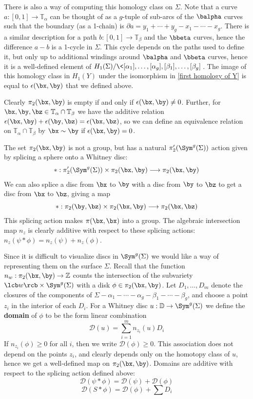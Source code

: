 There is also a way of computing this homology class on $\Sigma$. Note that a curve $a : [0,1] \rightarrow \mathbb T_\alpha$ can be thought of as a $g$-tuple of sub-arcs of the $\balpha$ curves such that the boundary (as a 1-chain) is $\partial a = y_1+\cdots+y_g-x_1-\cdots-x_g$. There is a similar description for a path $b : [0,1] \rightarrow \mathbb T_\beta$ and the $\bbeta$ curves, hence the difference $a-b$ is a 1-cycle in $\Sigma$. This cycle depends on the paths used to define it, but only up to additional windings around $\balpha$ and $\bbeta$ curves, hence it is a well-defined element of $H_1(\Sigma) / \< [\alpha_1],\ldots,[\alpha_g],[\beta_1],\ldots,[\beta_g] \>$. The image of this homology class in $H_1(Y)$ under the isomorphism in \cref{first homology of Y} is equal to $\epsilon(\bx,\by)$ that we defined above.

Clearly $\pi_2(\bx,\by)$ is empty if and only if $\epsilon(\bx,\by) \neq 0$. Further, for $\bx,\by,\bz \in \mathbb T_\alpha \cap \mathbb T_\beta$ we have the additive relation $\epsilon(\bx,\by) + \epsilon(\by,\bz) = \epsilon(\bx,\bz)$, so we can define an equivalence relation on $\mathbb T_\alpha \cap \mathbb T_\beta$ by $\bx \sim \by$ if $\epsilon(\bx,\by)=0$.

The set $\pi_2(\bx,\by)$ is not a group, but has a natural $\pi_2'(\Sym^g(\Sigma))$ action given by splicing a sphere onto a Whitney disc:
\[ * : \pi_2'(\Sym^g(\Sigma)) \times \pi_2(\bx,\by) \longrightarrow \pi_2(\bx,\by) \]
We can also splice a disc from $\bx$ to $\by$ with a disc from $\by$ to $\bz$ to get a disc from $\bx$ to $\bz$, giving a map
\[ * : \pi_2(\by,\bz) \times \pi_2(\bx,\by) \longrightarrow \pi_2(\bx,\bz) \]
This splicing action makes $\pi(\bx,\bx)$ into a group. The algebraic intersection map $n_z$ is clearly additive with respect to these splicing actions: $n_z(\psi * \phi) = n_z(\psi) + n_z(\phi)$. 

Since it is difficult to visualize discs in $\Sym^g(\Sigma)$ we would like a way of representing them on the surface $\Sigma$. Recall that the function $n_w : \pi_2(\bx,\by) \rightarrow \mathbb Z$ counts the intersection of the subvariety $\lcb w \rcb \times \Sym^g(\Sigma)$ with a disk $\phi \in \pi_2(\bx,\by)$. Let $D_1,\ldots,D_m$ denote the closures of the components of $\Sigma - \alpha_1 - \cdots - \alpha_g - \beta_1 - \cdots - \beta_g$, and choose a point $z_i$ in the interior of each $D_i$. For a Whitney disc $u : \mathbb D \rightarrow \Sym^g(\Sigma)$ we define the \textbf{domain} of $\phi$ to be the form linear combination
\[ \mathcal D(u) = \sum_{i=1}^m n_{z_i}(u) D_i \]
If $n_{z_i}(\phi) \geq 0$ for all $i$, then we write $\mathcal D(\phi) \geq 0$. This association does not depend on the points $z_i$, and clearly depends only on the homotopy class of $u$, hence we get a well-defined map on $\pi_2(\bx,\by)$. Domains are additive with respect to the splicing action defined above:
\[ \mathcal D(\psi * \phi) = \mathcal D(\psi) + \mathcal D(\phi) \]
\[ \mathcal D(S * \phi) = \mathcal D(\phi) + \sum D_i \]

